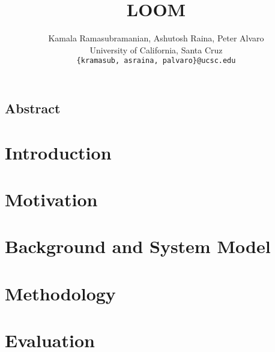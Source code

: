 \documentclass[letterpaper,twocolumn,10pt]{article}
\newcommand*{\affaddr}[1]{#1} %
\newcommand*{\email}[1]{\texttt{#1}}
\begin{document}
\date{}

\title{\Large \bf LOOM}

\author{
Kamala Ramasubramanian, Ashutosh Raina, Peter Alvaro\\
\affaddr{University of California, Santa Cruz}\\
\email{\{kramasub, asraina, palvaro\}@ucsc.edu}
}

\maketitle


\subsection*{Abstract}


\section{Introduction}


\section{Motivation}
\label{sec:motivation}


\section{Background and System Model}


\section{Methodology}


\section{Evaluation}

\end{document}
